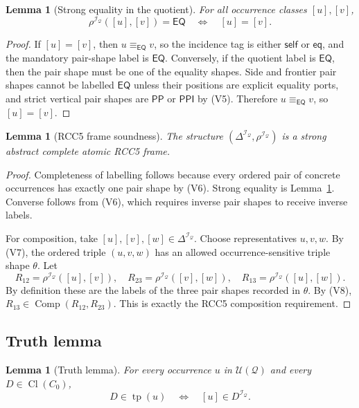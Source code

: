 \documentclass[11pt]{article}
\newtheorem{lemma}[theorem]{Lemma}
\newcommand{\EQ}{\mathsf{EQ}}
\newcommand{\PP}{\mathsf{PP}}
\newcommand{\PPI}{\mathsf{PPI}}
\newcommand{\comp}{\operatorname{Comp}}
\newcommand{\Cl}{\operatorname{Cl}}
\newcommand{\I}{\mathcal I}
\newcommand{\Q}{\mathcal Q}
\newcommand{\U}{\mathcal U}
\newcommand{\typ}{\operatorname{tp}}
\newcommand{\eqc}{\equiv_{\EQ}}
\newcommand{\self}{\mathsf{self}}
\newcommand{\eqtag}{\mathsf{eq}}
\begin{document}
\begin{lemma}[Strong equality in the quotient]\label{lem:strong-eq-sound}
For all occurrence classes $[u],[v]$,
\[
  \rho^{\I_\Q}([u],[v])=\EQ
  \quad\Longleftrightarrow\quad
  [u]=[v].
\]
\end{lemma}

\begin{proof}
If $[u]=[v]$, then $u\eqc v$, so the incidence tag is either $\self$ or $\eqtag$, and the mandatory pair-shape label is $\EQ$.  Conversely, if the quotient label is $\EQ$, then the pair shape must be one of the equality shapes.  Side and frontier pair shapes cannot be labelled $\EQ$ unless their positions are explicit equality ports, and strict vertical pair shapes are $\PP$ or $\PPI$ by (V5).  Therefore $u\eqc v$, so $[u]=[v]$.
\end{proof}

\begin{lemma}[RCC5 frame soundness]\label{lem:frame-sound}
The structure $(\Delta^{\I_\Q},\rho^{\I_\Q})$ is a strong abstract complete atomic RCC5 frame.
\end{lemma}

\begin{proof}
Completeness of labelling follows because every ordered pair of concrete occurrences has exactly one pair shape by (V6).  Strong equality is Lemma~\ref{lem:strong-eq-sound}.  Converse follows from (V6), which requires inverse pair shapes to receive inverse labels.

For composition, take $[u],[v],[w]\in\Delta^{\I_\Q}$.  Choose representatives $u,v,w$.  By (V7), the ordered triple $(u,v,w)$ has an allowed occurrence-sensitive triple shape $\theta$.  Let
\[
  R_{12}=\rho^{\I_\Q}([u],[v]),\quad
  R_{23}=\rho^{\I_\Q}([v],[w]),\quad
  R_{13}=\rho^{\I_\Q}([u],[w]).
\]
By definition these are the labels of the three pair shapes recorded in $\theta$.  By (V8), $R_{13}\in\comp(R_{12},R_{23})$.  This is exactly the RCC5 composition requirement.
\end{proof}

\subsection{Truth lemma}

\begin{lemma}[Truth lemma]\label{lem:truth}
For every occurrence $u$ in $\U(\Q)$ and every $D\in\Cl(C_0)$,
\[
   D\in\typ(u)
   \quad\Longleftrightarrow\quad
   [u]\in D^{\I_\Q}.
\]
\end{lemma}
\end{document}

